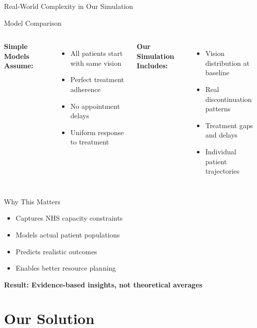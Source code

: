 \documentclass[10pt,aspectratio=169]{beamer}
\begin{document}
\begin{frame}{Real-World Complexity in Our Simulation}
\begin{alertblock}{Model Comparison}
\begin{columns}[T]
\textbf{Simple Models Assume:}
\begin{itemize}
    \item All patients start with same vision
    \item Perfect treatment adherence
    \item No appointment delays
    \item Uniform response to treatment
\end{itemize}

\textbf{Our Simulation Includes:}
\begin{itemize}
    \item \alert{Vision distribution at baseline}
    \item \alert{Real discontinuation patterns}
    \item \alert{Treatment gaps and delays}
    \item Individual patient trajectories
\end{itemize}
\end{columns}
\end{alertblock}

\begin{block}{Why This Matters}
\begin{itemize}
    \item Captures NHS capacity constraints
    \item Models actual patient populations
    \item Predicts realistic outcomes
    \item Enables better resource planning
\end{itemize}
\end{block}

\centering
\textbf{Result: Evidence-based insights, not theoretical averages}
\end{frame}

\section{Our Solution}
\end{document}
